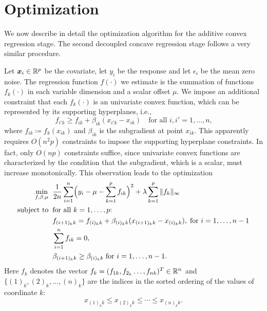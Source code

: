 \def\uds#1{#1}

\section{Optimization}
\label{sec:optimization}

We now describe in detail the optimization algorithm for the additive
convex regression stage.  The second decoupled concave regression stage
follows a very similar procedure.

Let $\boldsymbol{x}_{i}\in\mathbb{R}^{p}$ be the covariate, let $y_{i}$ be the
response and let $\epsilon_{i}$ be the mean zero noise. The regression function $f(\cdot)$ we estimate is the summation of 
functions $f_{k}(\cdot)$ in each variable dimension and a scalar offset $\mu$.  
We impose an additional constraint that each $f_{k}(\cdot)$ is 
an univariate convex function, which can be represented by its supporting hyperplanes, i.e.,
\begin{equation}\label{hyper}
      f_{i'k} \geq f_{ik} + \beta_{ik}(x_{i'k}-x_{ik}) \quad
      \textrm{for all $i,i' = 1,\ldots, n$,}
\end{equation}
where $f_{ik}\coloneqq f_{k}(x_{ik})$ and $\beta_{ik}$ is the
subgradient at point $x_{ik}$. This apparently requires $O(n^2 p)$ constraints to
impose the supporting hyperplane constraints.
In fact, only $O(np)$
constraints suffice, since univariate convex functions are
characterized by the condition that the subgradient, which is a scalar, must
increase monotonically. This observation leads to the  optimization
\begin{equation}
\begin{split}
       \min_{f,\beta,\mu} & \;\; \frac{1}{2n}\sum_{i=1}^{n}
                     \Bigl( y_{i}-\mu - \sum_{k=1}^{p}f_{ik}\Bigr)^{2} 
                         + \lambda\sum_{k=1}^{p}\|f_k\|_{\infty} \\
       \textrm{subject to} &\;\; \textrm{for all $k=1,\ldots, p$:}\\
       & \;\; f_{(i+1)_k k} = f_{(i)_k k} +
       \beta_{(i)_k k}(x_{(i+1)_k k}-x_{(i)_k k}),\;\textrm{for $i=1,\ldots, n-1$}\\
       & \;\; \sum_{i=1}^{n}f_{ik}=0,\\
       & \;\; \beta_{(i+1)_k k} \geq \beta_{(i)_k k}\;\textrm{for $i=1,\ldots, n-1$}.
\end{split}
\label{np}
\end{equation}
Here $f_k$ denotes the vector $f_k = (f_{1k}, f_{2_k}\ldots, f_{nk})^T\in{\mathbb R}^n$
and $\{(1)_k,(2)_k,\ldots,(n)_k\}$ are the indices in the sorted ordering
of the values of coordinate $k$:
\begin{equation}
x_{(1)_k k} \leq{} x_{(2)_k k} \leq \cdots \leq{} x_{(n)_k k}.
\end{equation}


